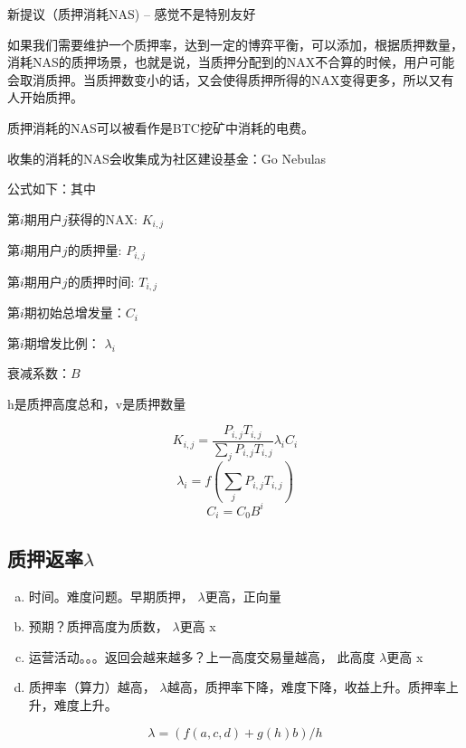新提议（质押消耗NAS) -- 感觉不是特别友好

如果我们需要维护一个质押率，达到一定的博弈平衡，可以添加，根据质押数量，消耗NAS的质押场景，也就是说，当质押分配到的NAX不合算的时候，用户可能会取消质押。当质押数变小的话，又会使得质押所得的NAX变得更多，所以又有人开始质押。

质押消耗的NAS可以被看作是BTC挖矿中消耗的电费。

收集的消耗的NAS会收集成为社区建设基金：Go Nebulas

公式如下：其中

        第\(i\)期用户\(j\)获得的NAX: \(K_{i,j}\)

        第\(i\)期用户\(j\)的质押量: \(P_{i,j}\)

        第\(i\)期用户\(j\)的质押时间: \(T_{i,j}\)

        第\(i\)期初始总增发量：\(C_i\)

        第\(i\)期增发比例： \(\lambda_i\)

        衰减系数：\(B\)

        h是质押高度总和，v是质押数量

\begin{equation}
  K_{i,j} = \frac{P_{i,j} T_{i,j}}{\sum_j P_{i,j} T_{i,j}} \lambda_i C_i
\end{equation}
\begin{equation}
  \lambda_i = f(\sum_j P_{i,j} T_{i,j})
\end{equation}
\begin{equation}
  C_i = C_0 B^i
\end{equation}

\subsection{质押返率\(\lambda\)}
\begin{enumerate}[a.]
  \item 时间。难度问题。早期质押， \(\lambda\)更高，正向量
  \item 预期？质押高度为质数， \(\lambda\)更高 x
  \item 运营活动。。。返回会越来越多？上一高度交易量越高， 此高度 \(\lambda\)更高 x
  \item 质押率（算力）越高， \(\lambda\)越高，质押率下降，难度下降，收益上升。质押率上升，难度上升。
\end{enumerate}

\begin{equation}
\lambda = (f(a, c, d) + g(h) b) / h
\end{equation}

